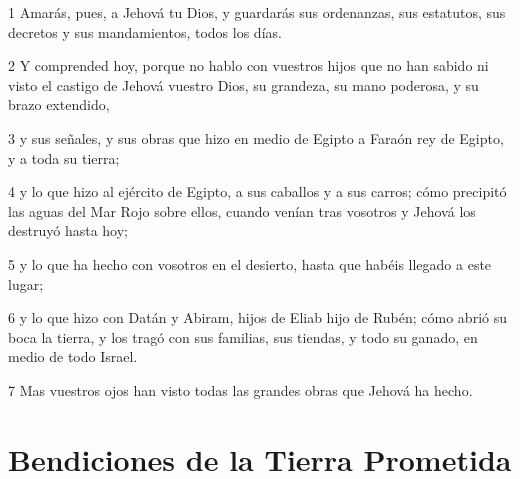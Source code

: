 \par 1 Amarás, pues, a Jehová tu Dios, y guardarás sus ordenanzas, sus estatutos, sus decretos y sus mandamientos, todos los días.
\par 2 Y comprended hoy, porque no hablo con vuestros hijos que no han sabido ni visto el castigo de Jehová vuestro Dios, su grandeza, su mano poderosa, y su brazo extendido,
\par 3 y sus señales, y sus obras que hizo en medio de Egipto a Faraón rey de Egipto, y a toda su tierra;
\par 4 y lo que hizo al ejército de Egipto, a sus caballos y a sus carros; cómo precipitó las aguas del Mar Rojo sobre ellos, cuando venían tras vosotros y Jehová los destruyó hasta hoy;
\par 5 y lo que ha hecho con vosotros en el desierto, hasta que habéis llegado a este lugar;
\par 6 y lo que hizo con Datán y Abiram, hijos de Eliab hijo de Rubén; cómo abrió su boca la tierra, y los tragó con sus familias, sus tiendas, y todo su ganado, en medio de todo Israel.
\par 7 Mas vuestros ojos han visto todas las grandes obras que Jehová ha hecho.

\section{Bendiciones de la Tierra Prometida}

